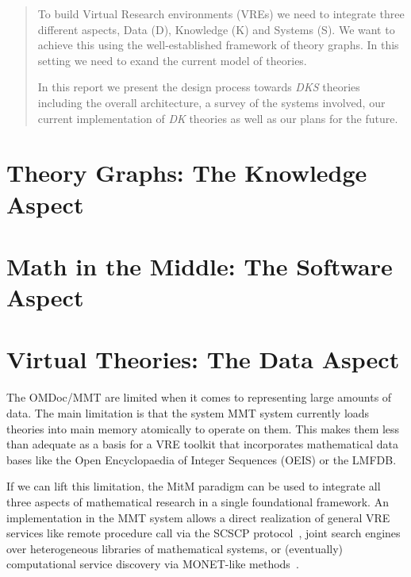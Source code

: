 \documentclass{../../Proposal/LaTeX-proposal/deliverablereport}
\author{Michael Kohlhase, Florian Rabe, Tom Wiesing, Paul-Olivier Dehaye}
\newcommand{\MMT}{MMT\xspace}
\begin{document}
\maketitle

\begin{abstract}
  To build Virtual Research environments (VREs) we need to integrate three different aspects, Data (D), Knowledge (K) and Systems (S). We want to achieve this using the well-established framework of theory graphs. In this setting we need to exand the current model of theories.

  In this report we present the design process towards \textit{DKS} theories including the overall architecture, a survey of the systems involved, our current implementation of \textit{DK} theories as well as our plans for the future.
\end{abstract}


\newpage\tableofcontents\newpage




\section{Theory Graphs: The Knowledge Aspect}\label{sec:MMT}
 
 
\section{Math in the Middle: The Software Aspect}\label{sec:mitm}
  
  
\section{Virtual Theories: The Data Aspect}\label{sec:data}
The OMDoc/MMT are limited when it comes to representing large amounts of data. The main
limitation is that the system \MMT system currently loads theories into main memory
atomically to operate on them. This makes them less than adequate as a basis for a VRE
toolkit that incorporates mathematical data bases like the Open Encyclopaedia of Integer
Sequences (OEIS) or the LMFDB.

If we can lift this limitation, the MitM paradigm can be used to integrate all three
aspects of mathematical research in a single foundational framework. An implementation in
the MMT system allows a direct realization of general VRE services like remote procedure
call via the SCSCP protocol~\cite{SCSCP,FHKLR:SCSCP08,HorRoz:ossp09}, joint search engines
over heterogeneous libraries of mathematical systems, or (eventually) computational
service discovery via MONET-like methods~\cite{aird-et-al:2005}.
\end{document}
